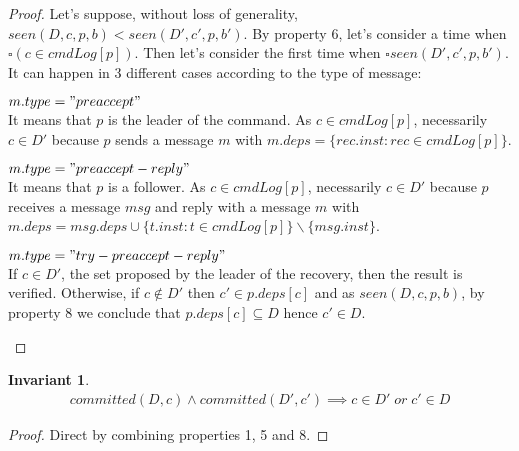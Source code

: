 \documentclass[a4paper]{article}
\theoremstyle{definition}
\theoremstyle{plain}
\newtheorem{invariant}{Invariant}
\begin{document}
\begin{proof}
Let's suppose, without loss of generality, $seen(D,c,p,b) < seen(D',c',p,b')$.
By property 6, let's consider a time when $\square(c \in cmdLog[p])$. Then let's consider the first time when $\square seen(D',c',p,b')$. It can happen in 3 different cases according to the type of message:

\begin{case}
    \item $m.type = "preaccept"$ \\
    It means that $p$ is the leader of the command. As $c \in cmdLog[p]$, necessarily $c \in D'$ because $p$ sends a message $m$ with $m.deps = \{rec.inst : rec \in cmdLog[p]\}$.  

    \item $m.type = "preaccept-reply"$ \\
    It means that $p$ is a follower. As $c \in cmdLog[p]$, necessarily $c \in D'$ because $p$ receives a message $msg$ and reply with a message $m$ with $m.deps = msg.deps \cup \{t.inst : t \in cmdLog[p]\}\backslash \{msg.inst\}$.

    \item $m.type = "try-preaccept-reply"$ \\
    If $c \in D'$, the set proposed by the leader of the recovery, then the result is verified. Otherwise, if $c \notin D'$ then $c' \in p.deps[c]$ and as $seen(D,c,p,b)$, by property 8 we conclude that $p.deps[c] \subseteq D$ hence $c' \in D$.
\end{case}

\end{proof}

\begin{invariant}
    \begin{align*}
    committed(D,c) \wedge committed(D',c') \implies c \in D' \; or \; c' \in D
    \end{align*}
\end{invariant}

\begin{proof}
Direct by combining properties 1, 5 and 8.
\end{proof}
\end{document}
